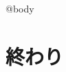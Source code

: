 \documentclass[uplatex, tate, book, oneside, paper={6.4in, 3.6in}, fontsize=14pt, number_of_lines=18, line_length=2.8in, open_bracket_pos=nibu_tentsuki, hanging_punctuation]{jlreq}
\date{}
\begin{document}
\showoutput
\maketitle
@{body}
\chapter{終わり}
\end{document}
